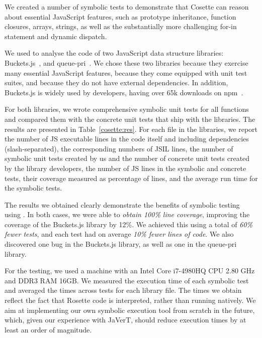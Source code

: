 We created a number of symbolic tests to demonstrate that Cosette can reason about essential JavaScript features, such as prototype inheritance, function closures, arrays, strings, as well as the substantially more challenging for-in statement and dynamic dispatch. 

We used \cosette to analyse the code of two JavaScript data structure libraries: Buckets.js~\cite{buckets}, and queue-pri~\cite{priq}.
We chose these two libraries because they exercise many essential JavaScript features, because they come equipped with unit test suites, and because they do not have external dependencies. In addition, Buckets.js is widely used by developers, having over 65k downloads on npm~\cite{npm}.

For both libraries, we wrote comprehensive symbolic unit tests for all functions and compared them with the concrete unit tests that ship with the libraries. The results are presented in Table~\ref{cosette:res}.
For each file in the libraries, we report the number of JS executable lines in the code itself and including dependencies (slash-separated), the corresponding numbers of JSIL lines, the number of symbolic unit tests created by us and the number of concrete unit tests created by the library developers, the number of JS lines in the symbolic and concrete tests, their coverage measured as percentage of lines, and the average \cosette run time for the symbolic tests.

The results we obtained clearly demonstrate the benefits of symbolic testing using \cosette.
In both cases, we were able to \emph{obtain 100\% line coverage}, improving the coverage of the Buckets.js library by 12\%.
We achieved this using a total of \emph{60\% fewer tests}, and each test had on average \emph{10\% fewer lines of code}.
We also discovered one bug in the Buckets.js library, as well as one in the queue-pri library. 


For the testing, we used a machine with an Intel Core i7-4980HQ CPU 2.80 GHz and DDR3 RAM 16GB. We measured the execution time of each symbolic test and averaged the times across tests for each library file. The times we obtain reflect the fact that Rosette code is interpreted, rather than running natively. We aim at implementing our own symbolic execution tool from scratch in the future, which, given our experience with JaVerT, should reduce execution times by at least an order of magnitude.

